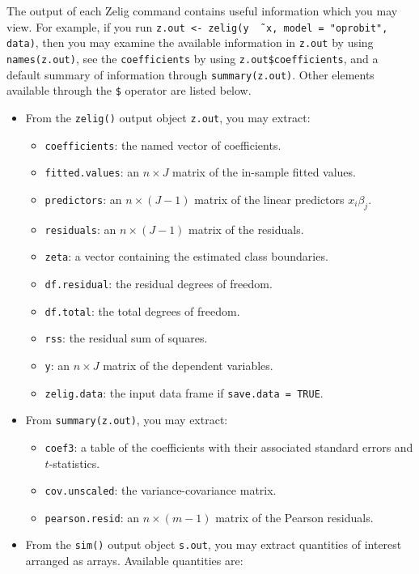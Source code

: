 \documentclass{article}
\begin{document}
The output of each Zelig command contains useful information which you
may view.  For example, if you run \texttt{z.out <- zelig(y \~\,
  x, model = "oprobit", data)}, then you may examine the available
information in \texttt{z.out} by using \texttt{names(z.out)},
see the {\tt coefficients} by using {\tt z.out\$coefficients}, and
a default summary of information through \texttt{summary(z.out)}.
Other elements available through the {\tt \$} operator are listed
below.

\begin{itemize}
\item From the {\tt zelig()} output object {\tt z.out}, you may
  extract:
   \begin{itemize}
   \item {\tt coefficients}: the named vector of coefficients.   
   \item {\tt fitted.values}: an $n \times J$ matrix of the in-sample
     fitted values.
   \item {\tt predictors}: an $n \times (J-1)$ matrix of the linear
     predictors $x_i \beta_j$.
   \item {\tt residuals}: an $n \times (J-1)$ matrix of the residuals. 
   \item {\tt zeta}: a vector containing the estimated class boundaries. 
   \item {\tt df.residual}: the residual degrees of freedom.  
   \item {\tt df.total}: the total degrees of freedom.
   \item {\tt rss}: the residual sum of squares.  
   \item {\tt y}: an $n \times J$ matrix of the dependent variables.
   \item {\tt zelig.data}: the input data frame if {\tt save.data = TRUE}.  
   \end{itemize}

\item From {\tt summary(z.out)}, you may extract:
\begin{itemize}
  \item {\tt coef3}: a table of the coefficients with their associated
    standard errors and $t$-statistics.
  \item {\tt cov.unscaled}: the variance-covariance matrix. 
  \item {\tt pearson.resid}: an $n \times (m-1)$ matrix of the Pearson residuals.  
\end{itemize}

 \item From the {\tt sim()} output object {\tt s.out}, you may extract
   quantities of interest arranged as arrays.  Available quantities
   are:


\end{itemize}
\end{document}
